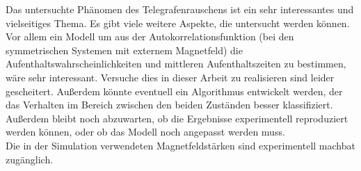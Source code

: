\documentclass[main.tex]{subfiles}
\begin{document}

Das untersuchte Phänomen des Telegrafenrauschens ist ein sehr interessantes und vielseitiges Thema. Es gibt viele weitere Aspekte, die untersucht werden können.\\
Vor allem ein Modell um aus der Autokorrelationsfunktion (bei den symmetrischen Systemen mit externem Magnetfeld) die Aufenthaltswahrscheinlichkeiten und mittleren Aufenthaltszeiten zu bestimmen, wäre sehr interessant. Versuche dies in dieser Arbeit zu realisieren sind leider gescheitert.
Außerdem könnte eventuell ein Algorithmus entwickelt werden, der das Verhalten im Bereich zwischen den beiden Zuständen besser klassifiziert.\\

Außerdem bleibt noch abzuwarten, ob die Ergebnisse experimentell reproduziert werden können, oder ob das Modell noch angepasst werden muss.\\
Die in der Simulation verwendeten Magnetfeldstärken sind experimentell machbat zugänglich. 



\end{document}
